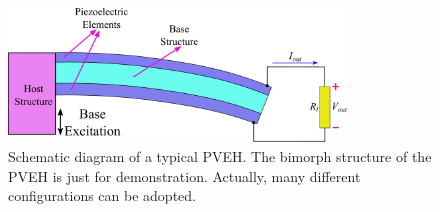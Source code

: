 \documentclass{article}
\begin{document}
\begin{figure}[!htbp]
    \centering
    \includegraphics[width=0.8\textwidth]{./img_eig_asy/fig_pveh}
    \caption{Schematic diagram of a typical PVEH. The bimorph structure of the PVEH is just for demonstration. Actually, many different configurations can be adopted. }
    \label{fig:fig_pveh}
\end{figure}
\end{document}
